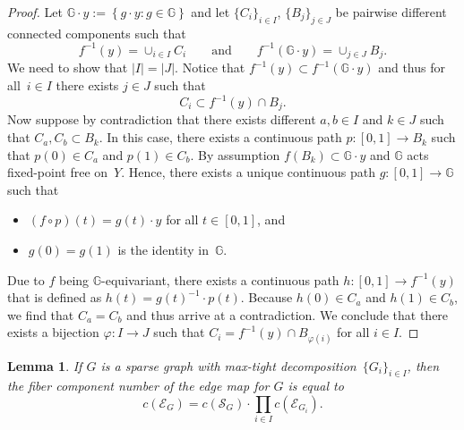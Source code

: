 \documentclass[12pt]{article}
\newtheorem{lemma}{Lemma}
\theoremstyle{definition}
\newenvironment{Mlist}{\begin{itemize}[topsep=0pt,itemsep=0pt,leftmargin=7mm]}{\end{itemize}}
\newcommand{\st}{such that }
\renewcommand{\c}{\colon}
\newcommand{\set}[2]{\left\{#1:#2\right\}}
\newcommand{\G}{{\mathbb{G}}}
\newcommand{\cE}{\mathcal{E}}
\newcommand{\cS}{\mathcal{S}}
\begin{document}
\begin{proof}
Let $\G\cdot y:=\set{g\cdot y}{g\in \G}$ and let $\{C_i\}_{i\in I}$, $\{B_j\}_{j\in J}$
be pairwise different connected components \st
\[
f^{-1}(y)=\cup_{i\in I} C_i
\qquad\text{and}\qquad
f^{-1}(\G\cdot y)=\cup_{j\in J} B_j.
\]
We need to show that $|I|=|J|$.
Notice that $f^{-1}(y)\subset f^{-1}(\G\cdot y)$ and thus for all~$i\in I$ there exists $j\in J$
\st
\[
C_i\subset f^{-1}(y)\cap B_j.
\]
Now suppose by contradiction that there exists different $a,b\in I$ and $k\in J$
\st $C_a,C_b\subset B_k$.
In this case, there exists a continuous path
$p\c [0,1]\to B_k$ \st $p(0)\in C_a$ and $p(1)\in C_b$.
By assumption $f(B_k)\subset \G\cdot y$ and $\G$ acts fixed-point free on~$Y$.
Hence, there exists a unique continuous path $g\c [0,1]\to \G$ \st
\begin{Mlist}
\item $(f\circ p)(t)=g(t)\cdot y$ for all $t\in[0,1]$, and
\item $g(0)=g(1)$ is the identity in~$\G$.
\end{Mlist}
Due to $f$ being $\G$-equivariant, there exists a
continuous path $h\c [0,1]\to f^{-1}(y)$ that is defined as $h(t)=g(t)^{-1}\cdot p(t)$.
Because $h(0)\in C_a$ and $h(1)\in C_b$, we find that $C_a=C_b$
and thus arrive at a contradiction.
We conclude that there exists a bijection $\varphi\c I\to J$ \st $C_i=f^{-1}(y)\cap B_{\varphi(i)}$
for all $i\in I$.
\end{proof}



\begin{lemma}
\label{lem:c}
If $G$ is a sparse graph with max-tight decomposition~$\{G_i\}_{i\in I}$,
then the fiber component number of the edge map for $G$ is equal to
\[
c(\cE_G)=c(\cS_G)\cdot \prod_{i\in I} c(\cE_{G_i}).
\]
\end{lemma}
\end{document}
